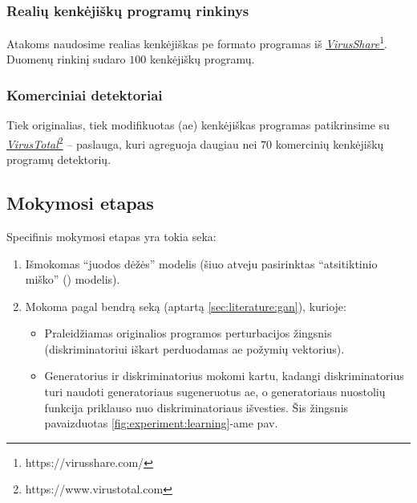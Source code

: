 \subsubsection{Realių kenkėjiškų programų rinkinys}\label{sec:experiment:virusshare}
Atakoms naudosime realias kenkėjiškas \acs{pe} formato programas iš
\href{https://virusshare.com/}{\textit{VirusShare}\footnote{https://virusshare.com/}}.
Duomenų rinkinį sudaro $100$ kenkėjiškų programų.

\subsubsection{Komerciniai detektoriai}
Tiek originalias, tiek modifikuotas (\acs{ae}) kenkėjiškas programas
patikrinsime su
\href{https://www.virustotal.com}{\textit{VirusTotal}\footnote{https://www.virustotal.com}}
-- paslauga, kuri agreguoja daugiau nei $70$ komercinių kenkėjiškų programų
detektorių.

\clearpage
\subsection{Mokymosi etapas}

Specifinis  mokymosi etapas yra tokia seka:
\begin{enumerate}
    \item Išmokomas \enquote{juodos dėžės} modelis (šiuo atveju pasirinktas
          \enquote{atsitiktinio miško} () modelis).
    \item Mokoma pagal bendrą seką (aptartą \ref{sec:literature:gan}), kurioje:
          \begin{itemize}
              \item Praleidžiamas originalios programos perturbacijos žingsnis (diskriminatoriui
                    iškart perduodamas \acs{ae} požymių vektorius).
              \item Generatorius ir diskriminatorius mokomi kartu, kadangi diskriminatorius turi
                    naudoti generatoriaus sugeneruotus \acs{ae}, o generatoriaus nuostolių funkcija
                    priklauso nuo diskriminatoriaus išvesties. Šis žingsnis pavaizduotas
                    \ref{fig:experiment:learning}-ame pav.
          \end{itemize}
\end{enumerate}

